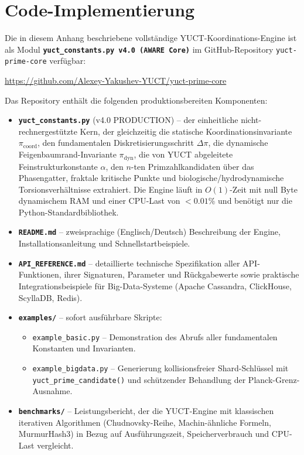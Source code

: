 \documentclass[12pt,a4paper]{article}
\begin{document}
	\section{Code-Implementierung}
	\label{sec:code}
	
	Die in diesem Anhang beschriebene vollständige \textsc{YUCT}-Koordinations-Engine ist als Modul
	\textbf{\texttt{yuct\_constants.py v4.0 (AWARE Core)}} im GitHub-Repository
	\texttt{yuct-prime-core} verfügbar:
	\begin{center}
		\url{https://github.com/Alexey-Yakushev-YUCT/yuct-prime-core}
	\end{center}
	
	\noindent Das Repository enthält die folgenden produktionsbereiten Komponenten:
	
	\begin{itemize}
		\item \textbf{\texttt{yuct\_constants.py}} (v4.0 PRODUCTION) – der einheitliche nicht-rechnergestützte Kern, der gleichzeitig die statische Koordinationsinvariante $\pi_{\mathrm{coord}}$, den fundamentalen Diskretisierungsschritt $\Delta\pi$, die dynamische Feigenbaumrand-Invariante $\pi_{\mathrm{dyn}}$, die von YUCT abgeleitete Feinstrukturkonstante $\alpha$, den $n$-ten Primzahlkandidaten über das Phasengatter, fraktale kritische Punkte und biologische/hydrodynamische Torsionsverhältnisse extrahiert. Die Engine läuft in $O(1)$-Zeit mit null Byte dynamischem RAM und einer CPU-Last von $<0.01\%$ und benötigt nur die Python-Standardbibliothek.
		
		\item \textbf{\texttt{README.md}} – zweisprachige (Englisch/Deutsch) Beschreibung der Engine, Installationsanleitung und Schnellstartbeispiele.
		
		\item \textbf{\texttt{API\_REFERENCE.md}} – detaillierte technische Spezifikation aller API-Funktionen, ihrer Signaturen, Parameter und Rückgabewerte sowie praktische Integrationsbeispiele für Big-Data-Systeme (Apache Cassandra, ClickHouse, ScyllaDB, Redis).
		
		\item \textbf{\texttt{examples/}} – sofort ausführbare Skripte:
		\begin{itemize}
			\item \texttt{example\_basic.py} – Demonstration des Abrufs aller fundamentalen Konstanten und Invarianten.
			\item \texttt{example\_bigdata.py} – Generierung kollisionsfreier Shard-Schlüssel mit \texttt{yuct\_prime\_candidate()} und schützender Behandlung der Planck-Grenz-Ausnahme.
		\end{itemize}
		
		\item \textbf{\texttt{benchmarks/}} – Leistungsbericht, der die YUCT-Engine mit klassischen iterativen Algorithmen (Chudnovsky-Reihe, Machin-ähnliche Formeln, MurmurHash3) in Bezug auf Ausführungszeit, Speicherverbrauch und CPU-Last vergleicht.
	\end{itemize}
	
\end{document}
